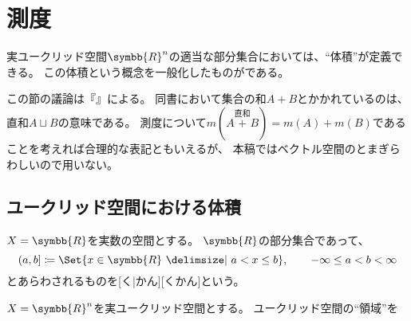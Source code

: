 \documentclass[../sotsu.tex]{subfiles}
\begin{document}
\section{測度}

実ユークリッド空間$\symbb{R}^n$の適当な部分集合においては、``体積''が定義できる。
この体積という概念を一般化したものがである。

この節の議論は\citeauthor{ito-lebesgue-1963}『』による。
同書において集合の和$A + B$とかかれているのは、直和$A \sqcup B$の意味である。
測度について$m(A \overset{直和}{+} B) = m(A) + m(B)$であることを考えれば合理的な表記ともいえるが、
本稿ではベクトル空間のとまぎらわしいので用いない。


\subsection{ユークリッド空間における体積}

$X = \symbb{R}$を実数の空間とする。
$\symbb{R}$の部分集合であって、
\begin{equation}
    (a, b] \coloneq \Set{  x \in \symbb{R}  \given  a < x \leq b  },
    \qquad -\infty \leq a < b < \infty
\end{equation}
とあらわされるものを[く|かん][くかん]という。

$X = \symbb{R}^n$を実ユークリッド空間とする。
ユークリッド空間の``領域''を
\end{document}
